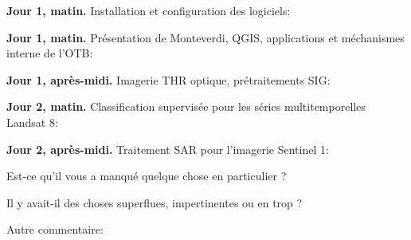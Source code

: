 \documentclass[10pt,a4paper]{article}
\begin{document}
\textbf{Jour 1, matin.} Installation et configuration des logiciels:
\moduleanswer

\textbf{Jour 1, matin.} Présentation de Monteverdi, QGIS, applications et méchanismes interne de l'OTB:
\moduleanswer

\textbf{Jour 1, après-midi.} Imagerie THR optique, prétraitements SIG:
\moduleanswer

\textbf{Jour 2, matin.} Classification supervisée pour les séries multitemporelles Landsat 8:
\moduleanswer

\textbf{Jour 2, après-midi.} Traitement SAR pour l'imagerie Sentinel 1:
\moduleanswer

Est-ce qu'il vous a manqué quelque chose en particulier ?
\vspace{6em}

Il y avait-il des choses superflues, impertinentes ou en trop ?
\vspace{6em}

Autre commentaire:
\end{document}
